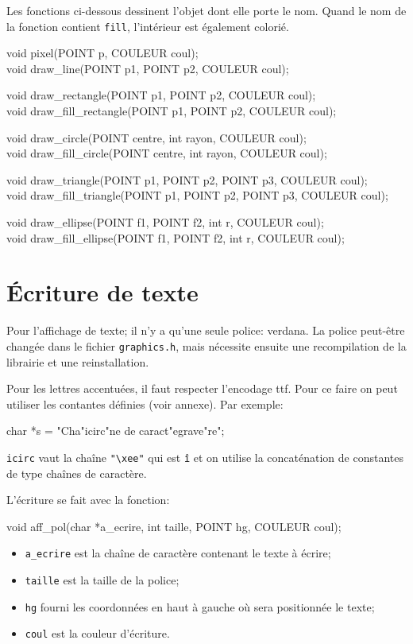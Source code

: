 \documentclass{article}
\newcommand\code[1]{
\begin{mdframed}[linecolor=purple,backgroundcolor=blue!10]
{\tt
#1
}
\end{mdframed}
}
\begin{document}
Les fonctions ci-dessous dessinent l'objet dont elle porte le nom.
Quand le nom de la fonction contient \texttt{fill}, l'intérieur est également
colorié.
\code{
void pixel(POINT p, COULEUR coul);\\
void draw\_line(POINT p1, POINT p2, COULEUR coul);

\vspace{3mm}
\noindent
void draw\_rectangle(POINT p1, POINT p2, COULEUR coul); \\
void draw\_fill\_rectangle(POINT p1, POINT p2, COULEUR coul);

\vspace{3mm}
\noindent
void draw\_circle(POINT centre, int rayon, COULEUR coul);\\
void draw\_fill\_circle(POINT centre, int rayon, COULEUR coul);

\vspace{3mm}
\noindent
void draw\_triangle(POINT p1, POINT p2, POINT p3, COULEUR coul);\\
void draw\_fill\_triangle(POINT p1, POINT p2, POINT p3, COULEUR coul);

\vspace{3mm}
\noindent
void draw\_ellipse(POINT f1, POINT f2, int r, COULEUR coul);\\
void draw\_fill\_ellipse(POINT f1, POINT f2, int r, COULEUR coul);
}


\section{Écriture de texte}
Pour l'affichage de texte; il n'y a qu'une seule police: verdana.
La police peut-être changée dans le fichier \texttt{graphics.h},
mais nécessite ensuite une recompilation de la librairie et une reinstallation.

Pour les lettres accentuées, il faut respecter l'encodage ttf.
Pour ce faire on peut utiliser les contantes définies (voir annexe).
Par exemple:
\code{
char *s = "Cha"icirc"ne de caract"egrave"re";
}
\texttt{icirc} vaut la chaîne \texttt{"\textbackslash xee"} qui est \texttt{î} et on utilise la concaténation
de constantes de type chaînes de caractère.

L'écriture se fait avec la fonction:
\code{
void aff\_pol(char *a\_ecrire, int taille, POINT hg, COULEUR coul);
}
\begin{itemize}
\item \texttt{a\_ecrire} est la chaîne de caractère contenant le texte à écrire;
\item \texttt{taille} est la taille de la police;
\item \texttt{hg} fourni les coordonnées en haut à gauche où sera positionnée le texte;
\item \texttt{coul} est la couleur d'écriture.
\end{itemize}
\end{document}
